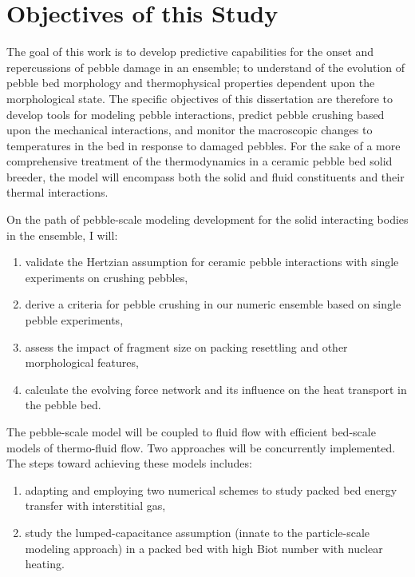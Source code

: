 \section{Objectives of this Study}\label{sec:intro-scope-of-work}
The goal of this work is to develop predictive capabilities for the onset and repercussions of pebble damage in an ensemble; to understand of the evolution of pebble bed morphology and thermophysical properties dependent upon the morphological state. The specific objectives of this dissertation are therefore to develop tools for modeling pebble interactions, predict pebble crushing based upon the mechanical interactions, and monitor the macroscopic changes to temperatures in the bed in response to damaged pebbles. For the sake of a more comprehensive treatment of the thermodynamics in a ceramic pebble bed solid breeder, the model will encompass both the solid and fluid constituents and their thermal interactions.

On the path of pebble-scale modeling development for the solid interacting bodies in the ensemble, I will:
\begin{enumerate}
	\item validate the Hertzian assumption for ceramic pebble interactions with single experiments on crushing pebbles,
	\item derive a criteria for pebble crushing in our numeric ensemble based on single pebble experiments,
	\item assess the impact of fragment size on packing resettling and other morphological features,
	\item calculate the evolving force network and its influence on the heat transport in the pebble bed.
\end{enumerate}

The pebble-scale model will be coupled to fluid flow with efficient bed-scale models of thermo-fluid flow. Two approaches will be concurrently implemented. The steps toward achieving these models includes:
\begin{enumerate}
	\item adapting and employing two numerical schemes to study packed bed energy transfer with interstitial gas,
	\item study the lumped-capacitance assumption (innate to the particle-scale modeling approach) in a packed bed with high Biot number with nuclear heating.
\end{enumerate}

